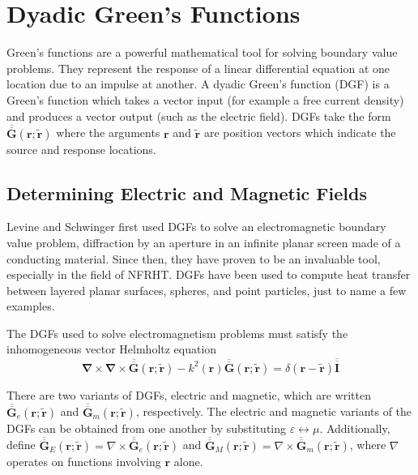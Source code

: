 \section{Dyadic Green's Functions} \label{sec:DGFs}
%
Green's functions are a powerful mathematical tool for solving boundary value problems. They represent the response of a linear differential equation at one location due to an impulse at another. A dyadic Green's function (DGF) is a Green's function which takes a vector input (for example a free current density) and produces a vector output (such as the electric field). DGFs take the form $\overline{\overline{\boldsymbol{G}}}(\boldsymbol{r}; \widetilde{\boldsymbol{r}})$ where the arguments $\boldsymbol{r}$ and $\widetilde{\boldsymbol{r}}$ are position vectors which indicate the source and response locations.

\subsection{Determining Electric and Magnetic Fields}
%
Levine and Schwinger\cite{Levine1950} first used DGFs to solve an electromagnetic boundary value problem, diffraction by an aperture in an infinite planar screen made of a conducting material. Since then, they have proven to be an invaluable tool, especially in the field of NFRHT. DGFs have been used to compute heat transfer between layered planar surfaces,\cite{Francoeur2009, Narayanaswamy2013a} spheres,\cite{Narayanaswamy2008, Sasihithlu2014, Czapla2017} and point particles,\cite{Ben-Abdallah2011, Messina2013, Asheichyk2017, Nikbakht2018} just to name a few examples.

The DGFs used to solve electromagnetism problems must satisfy the inhomogeneous vector Helmholtz equation
\begin{equation}
\boldsymbol{\nabla} \times \boldsymbol{\nabla} \times \overline{\overline{\boldsymbol{G}}}(\boldsymbol{r}; \widetilde{\boldsymbol{r}}) - k^{2}(\boldsymbol{r}) \overline{\overline{\boldsymbol{G}}}(\boldsymbol{r}; \widetilde{\boldsymbol{r}}) = \delta(\boldsymbol{r} - \widetilde{\boldsymbol{r}}) \overline{\overline{\boldsymbol{I}}}
\end{equation}

There are two variants of DGFs, electric and magnetic, which are written $\overline{\overline{\boldsymbol{G}}}_{e}(\boldsymbol{r}; \boldsymbol{\widetilde{r}})$ and $\overline{\overline{\boldsymbol{G}}}_{m}(\boldsymbol{r}; \boldsymbol{\widetilde{r}})$, respectively. The electric and magnetic variants of the DGFs can be obtained from one another by substituting $\varepsilon \leftrightarrow \mu$. Additionally, define $\overline{\overline{\boldsymbol{G}}}_{E}(\boldsymbol{r}; \boldsymbol{\widetilde{r}}) = \nabla \times \overline{\overline{\boldsymbol{G}}}_{e}(\boldsymbol{r}; \boldsymbol{\widetilde{r}})$ and $\overline{\overline{\boldsymbol{G}}}_{M}(\boldsymbol{r}; \boldsymbol{\widetilde{r}}) = \nabla \times \overline{\overline{\boldsymbol{G}}}_{m}(\boldsymbol{r}; \boldsymbol{\widetilde{r}})$, where $\nabla$ operates on functions involving $\boldsymbol{r}$ alone.


